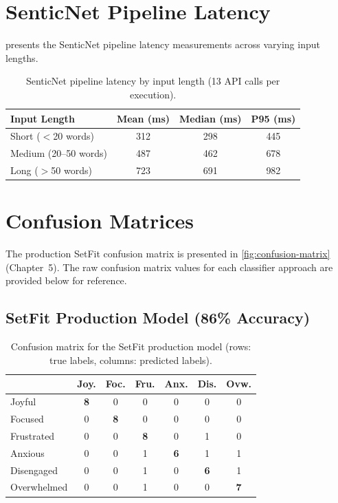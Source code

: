 \section{SenticNet Pipeline Latency}

 presents the SenticNet pipeline latency measurements across varying input lengths.

\begin{table}[htbp]
  \centering
  \caption{SenticNet pipeline latency by input length (13 API calls per execution).}
  \label{tab:senticnet-latency-detail}
  \begin{tabular}{@{}lccc@{}}
    \toprule
    \textbf{Input Length} & \textbf{Mean (ms)} & \textbf{Median (ms)} & \textbf{P95 (ms)} \\
    \midrule
    Short ($<$20 words)  & 312 & 298 & 445 \\
    Medium (20--50 words) & 487 & 462 & 678 \\
    Long ($>$50 words)   & 723 & 691 & 982 \\
    \bottomrule
  \end{tabular}
\end{table}

\section{Confusion Matrices}

The production SetFit confusion matrix is presented in \cref{fig:confusion-matrix} (Chapter~5). The raw confusion matrix values for each classifier approach are provided below for reference.

\subsection{SetFit Production Model (86\% Accuracy)}

\begin{table}[htbp]
  \centering
  \caption{Confusion matrix for the SetFit production model (rows: true labels, columns: predicted labels).}
  \label{tab:cm-setfit}
  \begin{tabular}{@{}l cccccc@{}}
    \toprule
    & \textbf{Joy.} & \textbf{Foc.} & \textbf{Fru.} & \textbf{Anx.} & \textbf{Dis.} & \textbf{Ovw.} \\
    \midrule
    Joyful      & \textbf{8} & 0 & 0 & 0 & 0 & 0 \\
    Focused     & 0 & \textbf{8} & 0 & 0 & 0 & 0 \\
    Frustrated  & 0 & 0 & \textbf{8} & 0 & 1 & 0 \\
    Anxious     & 0 & 0 & 1 & \textbf{6} & 1 & 1 \\
    Disengaged  & 0 & 0 & 1 & 0 & \textbf{6} & 1 \\
    Overwhelmed & 0 & 0 & 1 & 0 & 0 & \textbf{7} \\
    \bottomrule
  \end{tabular}
\end{table}


